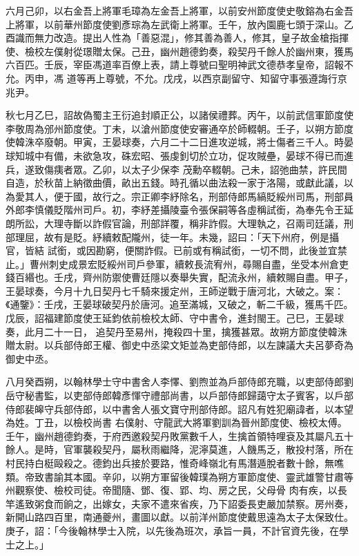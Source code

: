 \begin{pinyinscope}
 六月己卯，以右金吾上將軍毛璋為左金吾上將軍，以前安州節度使史敬鎔為右金吾上將軍，以前華州節度使劉彥琮為左武衛上將軍。壬午，放內園鹿七頭于深山。乙酉識而無力改造。提出人性為「善惡混」，修其善為善人，修其，皇子故金槍指揮使、檢校左僕射從璟贈太保。己丑，幽州趙德鈞奏，殺契丹千餘人於幽州東，獲馬六百匹。壬辰，宰臣馮道率百僚上表，請上尊號曰聖明神武文德恭孝皇帝，詔報不允。丙申，馮
 道等再上尊號，不允。戊戌，以西京副留守、知留守事張遵誨行京兆尹。



 秋七月乙巳，詔故偽蜀主王衍追封順正公，以諸侯禮葬。丙午，以前武信軍節度使李敬周為邠州節度使。丁未，以滄州節度使安審通卒於師輟朝。壬子，以朔方節度使韓洙卒廢朝。甲寅，王晏球奏，六月二十二日進攻逆城，將士傷者三千人。時晏球知城中有備，未欲急攻，硃宏昭、張虔釗切於立功，促攻賊壘，晏球不得已而進兵，遂致傷痍者眾。乙卯，以太子少保李
 茂勳卒輟朝。己未，詔弛曲禁，許民間自造，於秋苗上納徵曲價，畝出五錢。時孔循以曲法殺一家于洛陽，或獻此議，以為愛其人，便于國，故行之。宗正卿李紓除名，刑部侍郎馬縞貶綏州司馬，刑部員外郎李慎儀貶階州司戶。初，李紓差攝陵臺令張保嗣等各虛稱試銜，為奉先令王延朗所訟，大理寺斷以詐假官論，刑部詳覆，稱非詐假。大理執之，召兩司廷議，刑部理屈，故有是貶。紓續敕配隴州，徒一年。未幾，詔曰：「天下州府，例是攝官，皆結
 試銜，或因勘窮，便關詐假。已前或有稱試銜，一切不問，此後並宜禁止。」曹州刺史成景宏貶綏州司戶參軍，續敕長流宥州，尋賜自盡，坐受本州倉吏錢百緡也。壬戌，齊州防禦使曹廷隱以奏舉失實，配流永州，續敕賜自盡。甲子，王晏球奏，今月十九日契丹七千騎來援定州，王師逆戰于唐河北，大破之。案：《通鑒》：壬戌，王晏球破契丹於唐河。追至滿城，又破之，斬二千級，獲馬千匹。戊辰，詔福建節度使王延鈞依前檢校太師、守中書令，進封閩王。己巳，王晏球奏，此月二十一日，
 追契丹至易州，掩殺四十里，擒獲甚眾。故朔方節度使韓洙贈太尉。以兵部侍郎王權、御史中丞梁文矩並為吏部侍郎，以左諫議大夫呂夢奇為御史中丞。



 八月癸酉朔，以翰林學士守中書舍人李懌、劉煦並為戶部侍郎充職，以吏部侍郎劉岳守秘書監，以吏部侍郎韓彥惲守禮部尚書，以戶部侍郎歸藹守太子賓客，以戶部侍郎裴皞守兵部侍郎，以中書舍人張文寶守刑部侍郎。詔凡有姓犯廟諱者，以本望為姓。丁丑，以檢校尚書
 右僕射、守龍武大將軍劉訓為晉州節度使、檢校太傅。壬午，幽州趙德鈞奏，于府西邀殺契丹敗黨數千人，生擒首領特哩袞及其屬凡五十餘人。是時，官軍襲殺契丹，屬秋雨繼降，泥濘莫進，人饑馬乏，散投村落，所在村民持白梃毆殺之。德鈞出兵接於要路，惟奇峰嶺北有馬潛遁脫者數十餘，無噍類。帝致書諭其本國。辛卯，以朔方軍留後韓璞為朔方軍節度使、靈武雄警甘肅等州觀察使、檢校司徒。帝聞隨、鄧、復、郢、均、房之民，父母骨
 肉有疾，以長竿遙致粥食而餉之，出嫁女，夫家不遣來省疾，乃下詔委長吏嚴加禁察。房州奏，新開山路四百里，南通夔州，畫圖以獻。以前洋州節度使戴思遠為太子太保致仕。庚子，詔：「今後翰林學士入院，以先後為班次，承旨一員，不計官資先後，在學士之上。」




\end{pinyinscope}
